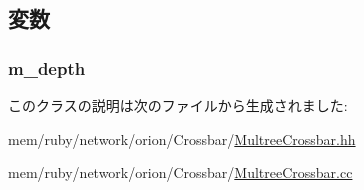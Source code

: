 \subsection{変数}
\hypertarget{classMultreeCrossbar_ad2e5a4e92c8ac5d402e25cc729040a8b}{
\subsubsection[{m\_\-depth}]{ {\bf m\_\-depth}}}
\label{classMultreeCrossbar_ad2e5a4e92c8ac5d402e25cc729040a8b}


このクラスの説明は次のファイルから生成されました:\begin{DoxyCompactItemize}
\item 
mem/ruby/network/orion/Crossbar/\hyperlink{MultreeCrossbar_8hh}{MultreeCrossbar.hh}\item 
mem/ruby/network/orion/Crossbar/\hyperlink{MultreeCrossbar_8cc}{MultreeCrossbar.cc}\end{DoxyCompactItemize}
